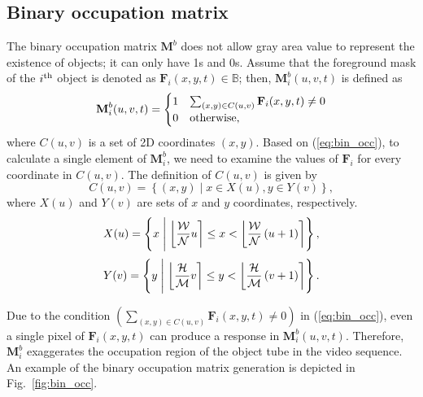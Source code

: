 \documentclass[11pt]{hyu_thesis}
\begin{document}
\subsection{Binary occupation matrix}
\label{sec:proposed:occ:binary}
The binary occupation matrix $\textbf{M}^b$ does not allow gray area value to represent the existence of objects; it can only have 1s and 0s. Assume that the foreground mask of the $i^{\rm{th}}$ object is denoted as $\textbf{F}_i(x,y,t) \in \mathbb{B}$; then, $\textbf{M}_i^b(u,v,t)$ is defined as
\begin{equation}
\label{eq:bin_occ}
\textbf{M}_i^b(u,v,t)=
\begin{cases}
1 & \sum_{(x,y) \in C(u,v)}\textbf{F}_i(x,y,t) \neq 0 \\
0 & \rm{otherwise},
\end{cases}
\end{equation}
where $C(u,v)$ is a set of 2D coordinates $(x,y)$. Based on (\ref{eq:bin_occ}), to calculate a single element of $\textbf{M}_i^b$, we need to examine the values of $\textbf{F}_i$ for every coordinate in $C(u,v)$. The definition of $C(u,v)$ is given by
\begin{equation}
C(u,v)=\left\{ (x,y) \mid x \in X(u), y \in Y(v) \right\},
\end{equation}
where $X(u)$ and $Y(v)$ are sets of $x$ and $y$ coordinates, respectively.
\begin{equation}
X(u)=\left\{ x \;\middle|\; \round*{\frac{\mathcal{W}}{\mathcal{N}}u} \leq x < \round*{\frac{\mathcal{W}}{\mathcal{N}}\left( u + 1 \right)} \right\},
\end{equation}
\begin{equation}
Y(v)=\left\{ y \;\middle|\; \round*{\frac{\mathcal{H}}{\mathcal{M}}v} \leq y < \round*{\frac{\mathcal{H}}{\mathcal{M}}\left( v + 1 \right)} \right\}.
\end{equation}

Due to the condition $\left( \sum_{(x,y) \in C(u,v)}\textbf{F}_i(x,y,t) \neq 0 \right)$ in (\ref{eq:bin_occ}), even a single pixel of $\textbf{F}_i(x,y,t)$ can produce a response in $\textbf{M}_i^b(u,v,t)$. Therefore, $\textbf{M}_i^b$ exaggerates the occupation region of the object tube in the video sequence. An example of the binary occupation matrix generation is depicted in Fig.~\ref{fig:bin_occ}.
\end{document}
